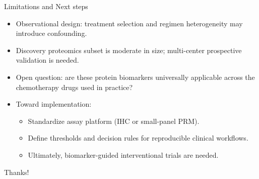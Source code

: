 \documentclass[10pt]{beamer}
\theoremstyle{plain}
\begin{document}
\begin{frame}{Limitations and Next steps}
  \begin{itemize}
    \item Observational design: treatment selection and regimen heterogeneity may introduce confounding.
    \item Discovery proteomics subset is moderate in size; multi-center prospective validation is needed.
    \item Open question: are these protein biomarkers universally applicable across the chemotherapy drugs used in practice? 
    \item Toward implementation:
    \begin{itemize}
      \item Standardize assay platform (IHC or small-panel PRM).
      \item Define thresholds and decision rules for reproducible clinical workflows.
      \item Ultimately, biomarker-guided interventional trials are needed.
    \end{itemize}
  \end{itemize}
\end{frame}

\begin{frame}
    \begin{center}
        {\Huge\calligra Thanks!}
    \end{center}
\end{frame}
\end{document}
